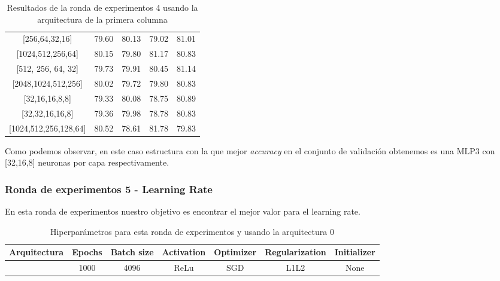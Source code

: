 \documentclass{article}
\begin{document}
\begin{center}
\begin{table}[h!]
\begin{tabular}{c|cccc}
{[}256,64,32,16{]}        & 79.60          & 80.13          & 79.02          & 81.01          \\
{[}1024,512,256,64{]}     & 80.15          & 79.80          & 81.17          & 80.83          \\
{[}512, 256, 64, 32{]}    & 79.73          & 79.91          & 80.45          & 81.14          \\
{[}2048,1024,512,256{]}   & 80.02          & 79.72          & 79.80          & 80.83          \\
{[}32,16,16,8,8{]}        & 79.33          & 80.08          & 78.75          & 80.89          \\
{[}32,32,16,16,8{]}       & 79.36          & 79.98          & 78.78          & 80.83          \\
{[}1024,512,256,128,64{]} & 80.52          & 78.61          & 81.78          & 79.83          \\ \hline
\end{tabular}

                \caption{Resultados de la ronda de experimentos 4 usando la arquitectura de la primera columna}
                \label{tab:res-j-a0-e4}
                \end{table}
                \end{center}
		    
		    Como podemos observar, en este caso estructura con la que mejor \textit{accuracy} en el conjunto de validaci\'on obtenemos es una MLP3 con [32,16,8] neuronas por capa respectivamente.
      \newpage
\subsubsection{Ronda de experimentos 5 - Learning Rate}  
En esta ronda de experimentos nuestro objetivo es encontrar el mejor valor para el learning rate. 

			\begin{table}[h!]
				\begin{center}
					\begin{tabular}{| c | c | c | c | c | c | c |}
						\textbf{Arquitectura} & \textbf{Epochs} & \textbf{Batch size} & \textbf{Activation} & \textbf{Optimizer} & \textbf{Regularization} & \textbf{Initializer}\\ \hline
						[32,16,8] & 1000 & 4096 & ReLu & SGD & L1L2 & None
					\end{tabular}
					\caption{Hiperpar\'ametros para esta ronda de experimentos y usando la arquitectura 0}
					\label{tab:hip-j-a0-e5}
				\end{center}
			\end{table}
			
\end{document}
